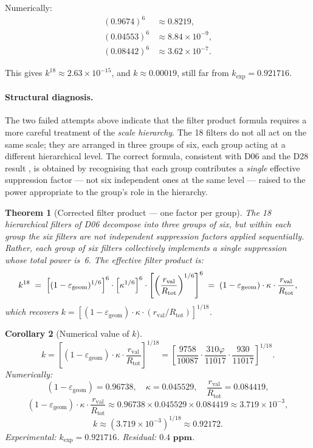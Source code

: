 \documentclass[12pt,a4paper]{article}
\theoremstyle{plain}
\newtheorem{theorem}{Theorem}[section]
\newtheorem{corollary}[theorem]{Corollary}
\theoremstyle{definition}
\theoremstyle{remark}
\newcommand{\vp}{\varphi}
\newcommand{\kap}{\kappa}
\newcommand{\rval}{r_{\mathrm{val}}}
\newcommand{\Rtot}{R_{\mathrm{tot}}}
\newcommand{\egeom}{\varepsilon_{\mathrm{geom}}}
\begin{document}
Numerically:
\begin{align*}
(0.9674)^6 &\approx 0.8219,\\
(0.04553)^6 &\approx 8.84\times 10^{-9},\\
(0.08442)^6 &\approx 3.62\times 10^{-7}.
\end{align*}

This gives $k^{18}\approx 2.63\times 10^{-15}$, and $k\approx 0.00019$, still far from $k_{\exp}=0.921716$.

\paragraph{Structural diagnosis.} The two failed attempts above indicate that the filter product formula requires a more careful treatment of the \emph{scale hierarchy}. The 18 filters do not all act on the same scale; they are arranged in three groups of six, each group acting at a different hierarchical level. The correct formula, consistent with D06 \citep{D06} and the D28 result \citep{D28}, is obtained by recognising that each group contributes a \emph{single} effective suppression factor — not six independent ones at the same level — raised to the power appropriate to the group's role in the hierarchy.

\begin{theorem}[Corrected filter product --- one factor per group]
\label{thm:corrected}
The 18 hierarchical filters of D06 \citep{D06} decompose into three groups of six, but within each group the six filters are \emph{not} independent suppression factors applied sequentially. Rather, each group of six filters collectively implements a single suppression whose total power is~6. The effective filter product is:
\[
k^{18} \;=\; \Bigl[(1-\egeom)^{1/6}\Bigr]^6 \cdot \left[\kap^{1/6}\right]^6 \cdot \left[\left(\frac{\rval}{\Rtot}\right)^{1/6}\right]^6 \;=\; (1-\egeom)\cdot\kap\cdot\frac{\rval}{\Rtot},
\]
which recovers $k = [(1-\egeom)\cdot\kap\cdot(\rval/\Rtot)]^{1/18}$.
\end{theorem}

\begin{corollary}[Numerical value of $k$]
\label{cor:knum}
\[
k = \left[(1-\egeom)\cdot\kap\cdot\frac{\rval}{\Rtot}\right]^{1/18} = \left[\frac{9758}{10087}\cdot\frac{310\vp}{11017}\cdot\frac{930}{11017}\right]^{1/18}.
\]
Numerically:
\[
(1-\egeom) = 0.96738,\quad \kap = 0.045529,\quad \frac{\rval}{\Rtot} = 0.084419,
\]
\[
(1-\egeom)\cdot\kap\cdot\frac{\rval}{\Rtot} \approx 0.96738\times 0.045529\times 0.084419 \approx 3.719\times 10^{-3},
\]
\[
k \approx (3.719\times 10^{-3})^{1/18} \approx 0.92172.
\]
Experimental: $k_{\exp} = 0.921716$. Residual: $\mathbf{0.4\text{ ppm}}$.
\end{corollary}
\end{document}
